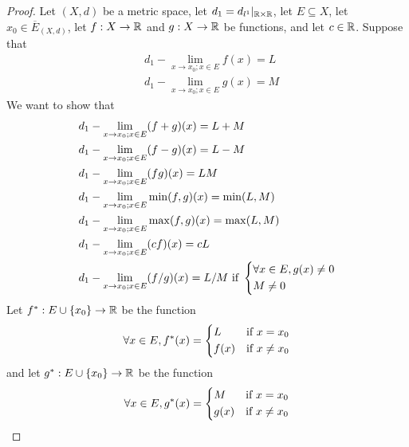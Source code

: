\begin{proof}
  Let \((X, d)\) be a metric space, let \(d_1 = d_{l^1}|_{\mathbb{R} \times \mathbb{R}}\), let \(E \subseteq X\), let \(x_0 \in \overline{E}_{(X, d)}\), let \(f : X \to \mathbb{R}\) and \(g : X \to \mathbb{R}\) be functions, and let \(c \in \mathbb{R}\).
  Suppose that
  \begin{align*}
     & d_1 - \lim_{x \to x_0 ; x \in E} f(x) = L \\
     & d_1 - \lim_{x \to x_0 ; x \in E} g(x) = M
  \end{align*}
  We want to show that
  \begin{align*}
     & d_1 - \lim_{x \to x_0 ; x \in E} (f + g)(x) = L + M                                          \\
     & d_1 - \lim_{x \to x_0 ; x \in E} (f - g)(x) = L - M                                          \\
     & d_1 - \lim_{x \to x_0 ; x \in E} (fg)(x) = LM                                                \\
     & d_1 - \lim_{x \to x_0 ; x \in E} \min(f, g)(x) = \min(L, M)                                  \\
     & d_1 - \lim_{x \to x_0 ; x \in E} \max(f, g)(x) = \max(L, M)                                  \\
     & d_1 - \lim_{x \to x_0 ; x \in E} (cf)(x) = cL                                                \\
     & d_1 - \lim_{x \to x_0 ; x \in E} (f / g)(x) = L / M \text{ if } \begin{dcases}
                                                                         \forall x \in E, g(x) \neq 0 \\
                                                                         M \neq 0
                                                                       \end{dcases}
  \end{align*}
  Let \(f^* : E \cup \{x_0\} \to \mathbb{R}\) be the function
  \[
    \forall x \in E, f^*(x) = \begin{dcases}
      L    & \text{if } x = x_0    \\
      f(x) & \text{if } x \neq x_0
    \end{dcases}
  \]
  and let \(g^* : E \cup \{x_0\} \to \mathbb{R}\) be the function
  \[
    \forall x \in E, g^*(x) = \begin{dcases}
      M    & \text{if } x = x_0    \\
      g(x) & \text{if } x \neq x_0
    \end{dcases}
\]
\end{proof}
